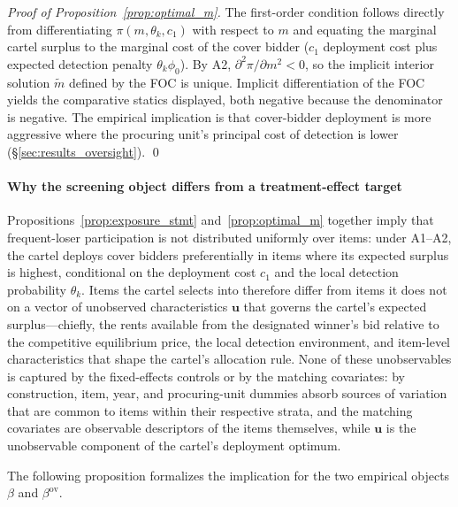 \begin{proof}[Proof of Proposition~\ref{prop:optimal_m}]
The first-order condition follows directly from differentiating
$\pi(m, \theta_k, c_1)$ with respect to $m$ and equating the
marginal cartel surplus to the marginal cost of the cover bidder
($c_1$ deployment cost plus expected detection penalty
$\theta_k \phi_0$). By A2, $\partial^2 \pi / \partial m^2 < 0$,
so the implicit interior solution $\tilde m$ defined by the FOC
is unique. Implicit differentiation of the FOC yields the
comparative statics displayed, both negative because the
denominator is negative. The empirical implication is that
cover-bidder deployment is more aggressive where the procuring
unit's principal cost of detection is lower
(§\ref{sec:results_oversight}). \qed
\end{proof}

\paragraph{Why the screening object differs from a treatment-effect
target}
Propositions~\ref{prop:exposure_stmt} and~\ref{prop:optimal_m}
together imply that frequent-loser participation is not
distributed uniformly over items: under A1--A2, the cartel
deploys cover bidders preferentially in items where its expected
surplus is highest, conditional on the deployment cost
$c_1$ and the local detection probability $\theta_k$. Items
the cartel selects into therefore differ from items it does not
on a vector of unobserved characteristics $\mathbf{u}$ that
governs the cartel's expected surplus---chiefly, the rents
available from the designated winner's bid relative to the
competitive equilibrium price, the local detection environment,
and item-level characteristics that shape the cartel's
allocation rule. None of these unobservables is captured by the
fixed-effects controls or by the matching covariates: by
construction, item, year, and procuring-unit dummies absorb
sources of variation that are common to items within their
respective strata, and the matching covariates are observable
descriptors of the items themselves, while $\mathbf{u}$ is the
unobservable component of the cartel's deployment optimum.

The following proposition formalizes the implication for the
two empirical objects $\beta$ and $\beta^{\text{ov}}$.

